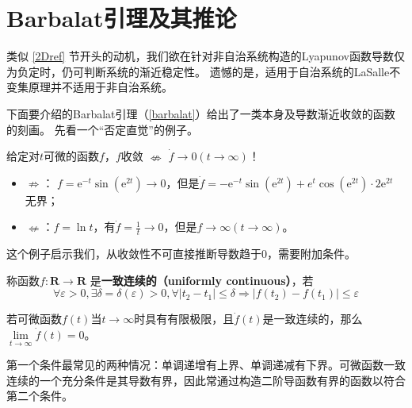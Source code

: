 \section{Barbalat引理及其推论}\label{3Eref}
类似 \ref{2Dref} 节开头的动机，我们欲在针对非自治系统构造的Lyapunov函数导数仅为负定时，仍可判断系统的渐近稳定性。
遗憾的是，适用于自治系统的LaSalle不变集原理并不适用于非自治系统。

下面要介绍的Barbalat引理（\ref{barbalat}）给出了一类本身及导数渐近收敛的函数的刻画。
先看一个“否定直觉”的例子。
\begin{example}
    给定对$t$可微的函数$f$，$f$收敛  $\nLeftrightarrow $ $\dot{f} \rightarrow 0(t \rightarrow \infty)$！
  \begin{itemize}[leftmargin=1em]
    \item $\nRightarrow $： $f = \mathrm{e}^{- t} \sin (\mathrm{e}^{2 t}) \rightarrow 0$，但是$ \dot{f} = - \mathrm{e}^{- t} \sin
    (\mathrm{e}^{2 t}) + e^t \cos (\mathrm{e}^{2 t}) \cdot 2 \mathrm{e}^{2 t}$ 无界；    
    \item $\nLeftarrow $：$f = \ln  t$，有$ \dot{f} = \frac{1}{t} \rightarrow0$，但是$f \rightarrow \infty(t \rightarrow \infty)$。
  \end{itemize}
\end{example}
这个例子启示我们，从收敛性不可直接推断导数趋于$0$，需要附加条件。
\begin{definition}
    称函数$f : \mathbf{R} \rightarrow \mathbf{R}$ 是{\bf 一致连续的（uniformly continuous）}，若
     \[\forall \varepsilon > 0, \exists \delta
  = \delta (\varepsilon) > 0, \forall | t_2 - t_1 | \leq \delta \Rightarrow |
  f (t_2) - f (t_1) | \leq \varepsilon\]
\end{definition}
\begin{theorem}[Barbalat引理]\label{barbalat}
    若可微函数$f(t)$当$t\to\infty$时具有有限极限，且$\dot{f}(t)$是一致连续的，那么$\lim\limits_{t\to\infty}\dot{f}(t)=0$。
\end{theorem}
\begin{note}
  第一个条件最常见的两种情况：单调递增有上界、单调递减有下界。可微函数一致连续的一个充分条件是其导数有界，因此常通过构造二阶导函数有界的函数以符合第二个条件。
\end{note}

